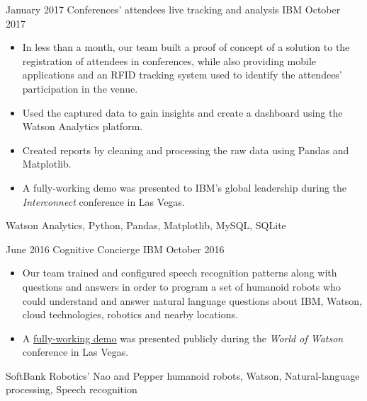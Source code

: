 %
%
%


\begin{projects}

    \project
        {January 2017}
        {Conferences' attendees live tracking and analysis}
        {IBM}
        {October 2017}
        {
            \begin{itemize}
                \item In less than a month, our team built a proof of concept 
                    of a solution to the registration of attendees in 
                    conferences, while also providing mobile applications and 
                    an RFID tracking system used to identify the attendees' 
                    participation in the venue.
                \item Used the captured data to gain insights and create a 
                    dashboard using the Watson Analytics platform.
                \item Created reports by cleaning and processing the raw data 
                    using Pandas and Matplotlib.
                \item A fully-working demo was presented to IBM's global 
                    leadership during the \textit{Interconnect} conference in 
                    Las Vegas.
            \end{itemize}
        }
        {
            Watson Analytics,
            Python,
            Pandas,
            Matplotlib,
            MySQL,
            SQLite
        }

    \emptySeparator

    \project
        {June 2016}
        {Cognitive Concierge}
        {IBM}
        {October 2016}
        {
            \begin{itemize}
                \item Our team trained and configured speech recognition 
                    patterns along with questions and answers in order to 
                    program a set of humanoid robots who could understand and 
                    answer natural language questions about IBM, Watson, cloud 
                    technologies, robotics and nearby locations.
                \item A \href{https://www.youtube.com/watch?v=yC0EOEdedzQ}
                    {\underline{fully-working demo}} was presented publicly 
                    during the \textit{World of Watson} conference in Las Vegas.
            \end{itemize}
        }
        {
            SoftBank Robotics' Nao and Pepper humanoid robots,
            Watson,
            Natural-language processing,
            Speech recognition
        }


\end{projects}
